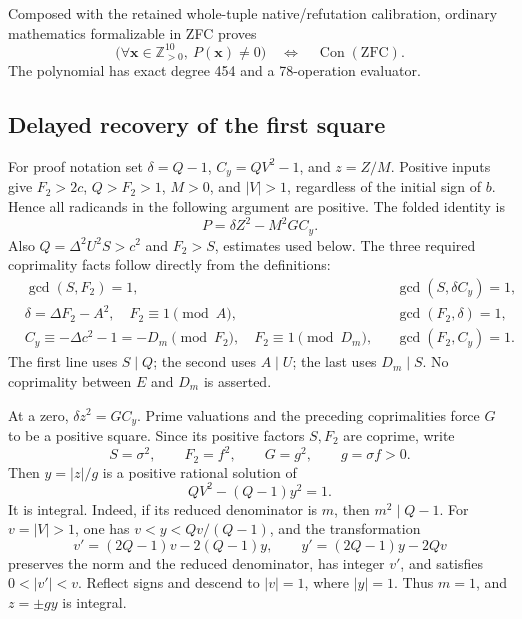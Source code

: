\begin{theorem}
Composed with the retained whole-tuple native/refutation calibration,
ordinary mathematics formalizable in ZFC proves
\[
 \bigl(\forall\mathbf x\in\mathbb Z_{>0}^{10},\ P(\mathbf x)\ne0\bigr)
 \quad\Longleftrightarrow\quad\operatorname{Con}(\mathrm{ZFC}).
\]
The polynomial has exact degree 454 and a 78-operation evaluator.
\end{theorem}

\subsection{Delayed recovery of the first square}

For proof notation set \(\delta=Q-1\), \(C_y=QV^2-1\), and
\(z=Z/M\). Positive inputs give \(F_2>2c\), \(Q>F_2>1\), \(M>0\),
and \(|V|>1\), regardless of the initial sign of \(b\). Hence all
radicands in the following argument are positive. The folded identity is
\[
 P=\delta Z^2-M^2GC_y.
\]
Also \(Q=\Delta^2U^2S>c^2\) and \(F_2>S\), estimates used below.
The three required coprimality facts follow directly from the definitions:
\begin{align*}
 &\gcd(S,F_2)=1,
 &&\gcd(S,\delta C_y)=1,\\
 &\delta=\Delta F_2-A^2,\quad F_2\equiv1\pmod A,
 &&\gcd(F_2,\delta)=1,\\
 &C_y\equiv-\Delta c^2-1=-D_m\pmod{F_2},
 \quad F_2\equiv1\pmod{D_m},
 &&\gcd(F_2,C_y)=1.
\end{align*}
The first line uses \(S\mid Q\); the second uses \(A\mid U\); the
last uses \(D_m\mid S\). No coprimality between \(E\) and \(D_m\)
is asserted.

At a zero, \(\delta z^2=GC_y\). Prime valuations and the preceding
coprimalities force \(G\) to be a positive square. Since its positive
factors \(S,F_2\) are coprime, write
\[
 S=\sigma^2,\qquad F_2=f^2,\qquad G=g^2,
 \qquad g=\sigma f>0.
\]
Then \(y=|z|/g\) is a positive rational solution of
\begin{equation}
 QV^2-(Q-1)y^2=1.\label{eq:compactadjacent}
\end{equation}
It is integral. Indeed, if its reduced denominator is \(m\), then
\(m^2\mid Q-1\). For \(v=|V|>1\), one has
\(v<y<Qv/(Q-1)\), and the transformation
\[
 v'=(2Q-1)v-2(Q-1)y,\qquad
 y'=(2Q-1)y-2Qv
\]
preserves the norm and the reduced denominator, has integer \(v'\), and
satisfies \(0<|v'|<v\). Reflect signs and descend to \(|v|=1\), where
\(|y|=1\). Thus \(m=1\), and \(z=\pm gy\) is integral.

